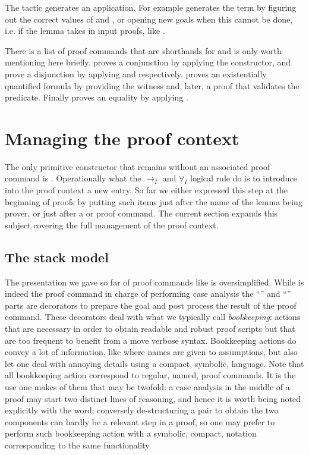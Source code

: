 The  tactic generates an application.  For example 
generates the term  by figuring out the correct values of
 and , or opening new goals when this cannot be done, i.e.
if the lemma takes in input proofs, like .

There is a list of proof commands that are shorthands for 
and is only worth mentioning here briefly.  proves a conjunction
by applying the  constructor,  and  prove a
disjunction by applying  and  respectively.
 proves an existentially quantified formula by providing
the witness  and, later, a proof that  validates the predicate.
Finally  proves an equality by applying .

\section{Managing the proof context}
The only primitive constructor that remains without an associated proof command
is .  Operationally what the $\to_I$ and
$\forall_I$ logical rule do is to introduce into the proof context a
new entry.  So far we either expressed this step at the beginning of proofs
by putting such items just after the name of the lemma being prover, or
just after a  or  proof command.  The current section
expands this subject covering the full management of the proof context.

\subsection{The stack model}

The presentation we gave so far of proof commands like 
is oversimplified.  While  is indeed the proof command in
charge of performing case analysis the ``'' and ``\C{=> [|m]}''
parts are decorators to prepare the goal and post process the result of
the proof command.  These decorators deal with what we typically call
\emph{bookkeeping}: actions that are necessary in order to obtain readable and
robust proof scripts but that are too frequent to benefit from a move verbose
syntax.  Bookkeeping actions do convey a lot of information, like where
names are given to assumptions, but also let one deal with annoying details
using a compact, symbolic, language.  Note that all bookkeeping action
correspond to regular, named, proof commands.  It is the use one makes of them
that may be twofold: a case analysis in the middle of a proof may start two
distinct lines of reasoning, and hence it is worth being noted explicitly with
the  word; conversely de-structuring a pair to obtain the two
components can hardly be a relevant step in a proof, so one may prefer to
perform such bookkeeping action with a symbolic, compact, notation
corresponding to the same  functionality.

